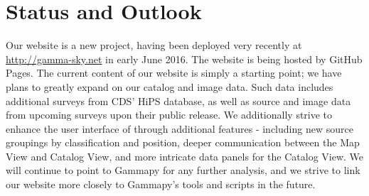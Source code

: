 \section{Status and Outlook}

%
%


Our website is a new project, having been deployed very recently at \url{http://gamma-sky.net} in early June 2016. The website is being hosted by GitHub Pages. The current content of our website is simply a starting point; we have plans to greatly expand on our catalog and image data. Such data includes additional surveys from CDS' HiPS database, as well as source and image data from upcoming surveys upon their public release. We additionally strive to enhance the user interface of \gammasky through additional features - including new source groupings by classification and position, deeper communication between the Map View and Catalog View, and more intricate data panels for the Catalog View. We will continue to point to Gammapy for any further analysis, and we strive to link our website more closely to Gammapy's tools and scripts in the future.
